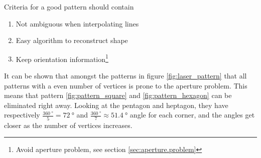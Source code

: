 Criteria for a good pattern should contain
\begin{enumerate}
	\item Not ambiguous when interpolating lines
	\item Easy algorithm to reconstruct shape
	\item Keep orientation information\footnote{Avoid aperture problem, see section \vref{sec:aperture.problem}}
\end{enumerate}

It can be shown that amongst the patterns in figure \vref{fig:laser_pattern} that all patterns with a even number 
of vertices is prone to the aperture problem. This means that pattern \ref{fig:pattern_square} 
and \ref{fig:pattern_hexagon} can be eliminated right away. Looking at the pentagon and heptagon, they 
have respectively $\frac{\SI{360}{\degree}}{5} = \SI{72}{\degree}$ and $\frac{\SI{360}{\degree}}{7} \approx \SI{51.4}{\degree}$ angle 
for each corner, and the angles get closer as the number of vertices increases.